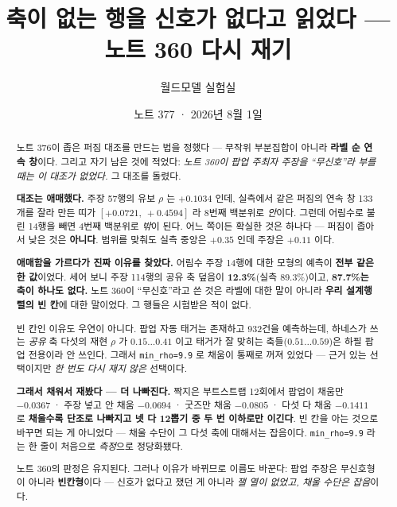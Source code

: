 \documentclass[11pt]{article}
\begin{document}
\title{축이 없는 행을 신호가 없다고 읽었다 --- 노트 360 다시 재기}
\author{월드모델 실험실}
\date{노트 377 · 2026년 8월 1일}
\maketitle

\begin{abstract}
노트 376이 좁은 퍼짐 대조를 만드는 법을 정했다 --- 무작위 부분집합이
아니라 \textbf{라벨 순 연속 창}이다. 그리고 자기 남은 것에 적었다:
\emph{노트 360이 팝업 주최자 주장을 ``무신호''라 부를 때는 이 대조가
없었다.} 그 대조를 돌렸다.

\textbf{대조는 애매했다.} 주장 57행의 유보 $\rho$ 는 $+0.1034$ 인데,
실측에서 같은 퍼짐의 연속 창 133개를 잘라 만든 띠가
$[+0.0721,\ +0.4594]$ 라 8번째 백분위로 \emph{안}이다. 그런데 어림수로
불린 14행을 빼면 4번째 백분위로 \emph{밖}이 된다. 어느 쪽이든 확실한
것은 하나다 --- 퍼짐이 좁아서 낮은 것은 \textbf{아니다}. 범위를 맞춰도
실측 중앙은 $+0.35$ 인데 주장은 $+0.11$ 이다.

\textbf{애매함을 가르다가 진짜 이유를 찾았다.} 어림수 주장 14행에 대한
모형의 예측이 \textbf{전부 같은 한 값}이었다. 세어 보니 주장 114행의 공유
축 덮음이 \textbf{12.3\%}(실측 89.3\%)이고, \textbf{87.7\%는 축이 하나도
없다.} 노트 360이 ``무신호''라고 쓴 것은 라벨에 대한 말이 아니라
\textbf{우리 설계행렬의 빈 칸}에 대한 말이었다. 그 행들은 시험받은 적이
없다.

빈 칸인 이유도 우연이 아니다. 팝업 자동 태거는 존재하고 932건을 예측하는데,
하네스가 쓰는 \emph{공유} 축 다섯의 재현 $\rho$ 가 $0.15\ldots0.41$ 이고
태거가 잘 맞히는 축들($0.51\ldots0.59$)은 하필 팝업 전용이라 안 쓰인다.
그래서 \texttt{min\_rho=9.9} 로 채움이 통째로 꺼져 있었다 --- 근거 있는
선택이지만 \emph{한 번도 다시 재지 않은} 선택이다.

\textbf{그래서 채워서 재봤다 --- 더 나빠진다.} 짝지은 부트스트랩 12회에서
팝업이 채움만 $-0.0367$ · 주장 넣고 안 채움 $-0.0694$ · 굿즈만 채움
$-0.0805$ · 다섯 다 채움 $\mathbf{-0.1411}$ 로 \textbf{채울수록 단조로
나빠지고 넷 다 12뽑기 중 두 번 이하로만 이긴다}. 빈 칸을 아는 것으로
바꾸면 되는 게 아니었다 --- 채울 수단이 그 다섯 축에 대해서는 잡음이다.
\texttt{min\_rho=9.9} 라는 한 줄이 처음으로 \emph{측정}으로 정당화됐다.

노트 360의 판정은 유지된다. 그러나 이유가 바뀌므로 이름도 바꾼다:
팝업 주장은 무신호형이 아니라 \textbf{빈칸형}이다 --- 신호가 없다고
쟀던 게 아니라 \emph{잴 열이 없었고, 채울 수단은 잡음}이다.
\end{abstract}
\end{document}
